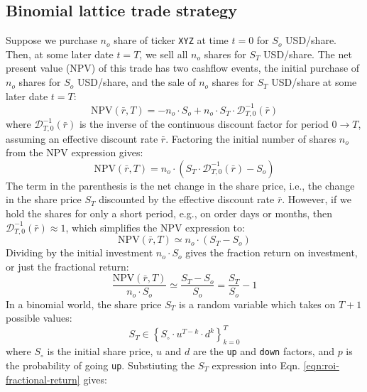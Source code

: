 \documentclass[11pt]{article}
\theoremstyle{definition}
\begin{document}
\subsection{Binomial lattice trade strategy}
Suppose we purchase $n_{o}$ share of ticker \texttt{XYZ} at time $t=0$ for $S_{o}$ USD/share.
Then, at some later date $t=T$, we sell all $n_{o}$ shares for $S_{T}$ USD/share. 
The net present value (NPV) of this trade has two cashflow events, the initial purchase of $n_{o}$ shares for $S_{o}$ USD/share,
and the sale of $n_{o}$ shares for $S_{T}$ USD/share at some later date $t=T$:
\begin{equation}
\text{NPV}(\bar{r},T) = -n_{o}\cdot{S_{o}} + n_{o}\cdot{S_{T}}\cdot\mathcal{D}_{T,0}^{-1}(\bar{r})
\end{equation}
where $\mathcal{D}_{T,0}^{-1}(\bar{r})$ is the inverse of the continuous discount factor 
for period $0\rightarrow{T}$, assuming an effective discount rate $\bar{r}$. 
Factoring the initial number of shares $n_{o}$ from the NPV expression gives:
\begin{equation}
\text{NPV}(\bar{r},T) = n_{o}\cdot\left(S_{T}\cdot\mathcal{D}_{T,0}^{-1}(\bar{r}) - S_{o}\right)
\end{equation}
The term in the parenthesis is the net change in the share price, i.e., the change in the share price $S_{T}$ discounted by the effective discount rate $\bar{r}$.
However, if we hold the shares for only a short period, e.g., on order days or months, then $\mathcal{D}_{T,0}^{-1}(\bar{r})\approx{1}$, which
simplifies the NPV expression to:
\begin{equation}
\text{NPV}(\bar{r}, T) \simeq n_{o}\cdot(S_{T}-S_{o})
\end{equation}
Dividing by the initial investment $n_{o}\cdot{S_{o}}$ gives the fraction return on investment, or just the fractional return:
\begin{equation}\label{eqn:roi-fractional-return}
\frac{\text{NPV}(\bar{r}, T)}{n_{o}\cdot{S_{o}}} \simeq \frac{S_{T}-S_{o}}{S_{o}} = \frac{S_{T}}{S_{o}} - 1
\end{equation}
In a binomial world, the share price $S_{T}$ is a random variable which takes on $T+1$ possible values:
\begin{equation}
S_{T} \in \left\{S_{\circ}\cdot{u}^{T-k}\cdot{d}^{k}\right\}_{k=0}^{T}
\end{equation}
where $S_{\circ}$ is the initial share price, $u$ and $d$ are the \texttt{up} and \texttt{down} factors, and $p$ is the probability of going \texttt{up}.
Substiuting the $S_{T}$ expression into Eqn. \eqref{eqn:roi-fractional-return} gives:
\end{document}
